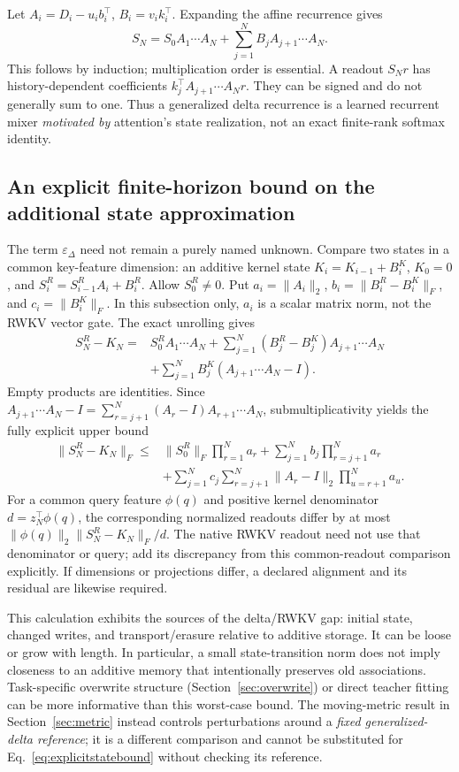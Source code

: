 \documentclass{article}
\theoremstyle{remark}\newtheorem{remark}[theorem]{Remark}
\begin{document}
Let $A_i=D_i-u_ib_i^\top$, $B_i=v_ik_i^\top$. Expanding the affine recurrence gives
\begin{equation}
 S_N=S_0A_1\cdots A_N+\sum_{j=1}^NB_jA_{j+1}\cdots A_N.
 \label{eq:generalunroll}
\end{equation}
This follows by induction; multiplication order is essential. A readout $S_Nr$ has history-dependent coefficients $k_j^\top A_{j+1}\cdots A_Nr$. They can be signed and do not generally sum to one. Thus a generalized delta recurrence is a learned recurrent mixer \emph{motivated by} attention's state realization, not an exact finite-rank softmax identity.

\subsection{An explicit finite-horizon bound on the additional state approximation}
The term $\varepsilon_\Delta$ need not remain a purely named unknown. Compare two states in a common key-feature dimension: an additive kernel state $K_i=K_{i-1}+B_i^K$, $K_0=0$, and $S_i^R=S_{i-1}^RA_i+B_i^R$. Allow $S_0^R\ne0$. Put $a_i=\|A_i\|_2$, $b_i=\|B_i^R-B_i^K\|_F$, and $c_i=\|B_i^K\|_F$. In this subsection only, $a_i$ is a scalar matrix norm, not the RWKV vector gate. The exact unrolling gives
\begin{align}
 S_N^R-K_N={}&S_0^RA_1\cdots A_N
 +\sum_{j=1}^N(B_j^R-B_j^K)A_{j+1}\cdots A_N\nonumber\\
 &+\sum_{j=1}^NB_j^K(A_{j+1}\cdots A_N-I).
 \label{eq:explicitstatecomparison}
\end{align}
Empty products are identities. Since
$A_{j+1}\cdots A_N-I=\sum_{r=j+1}^N(A_r-I)A_{r+1}\cdots A_N$,
submultiplicativity yields the fully explicit upper bound
\begin{align}
 \|S_N^R-K_N\|_F\le{}&\|S_0^R\|_F\prod_{r=1}^Na_r
 +\sum_{j=1}^Nb_j\prod_{r=j+1}^Na_r\nonumber\\
 &+\sum_{j=1}^Nc_j\sum_{r=j+1}^N\|A_r-I\|_2
 \prod_{u=r+1}^Na_u.
 \label{eq:explicitstatebound}
\end{align}
For a common query feature $\phi(q)$ and positive kernel denominator $d=z_N^\top\phi(q)$, the corresponding normalized readouts differ by at most
$\|\phi(q)\|_2\|S_N^R-K_N\|_F/d$.
The native RWKV readout need not use that denominator or query; add its discrepancy from this common-readout comparison explicitly. If dimensions or projections differ, a declared alignment and its residual are likewise required.

This calculation exhibits the sources of the delta/RWKV gap: initial state, changed writes, and transport/erasure relative to additive storage. It can be loose or grow with length. In particular, a small state-transition norm does not imply closeness to an additive memory that intentionally preserves old associations. Task-specific overwrite structure (Section~\ref{sec:overwrite}) or direct teacher fitting can be more informative than this worst-case bound. The moving-metric result in Section~\ref{sec:metric} instead controls perturbations around a \emph{fixed generalized-delta reference}; it is a different comparison and cannot be substituted for Eq.~\eqref{eq:explicitstatebound} without checking its reference.
\end{document}
